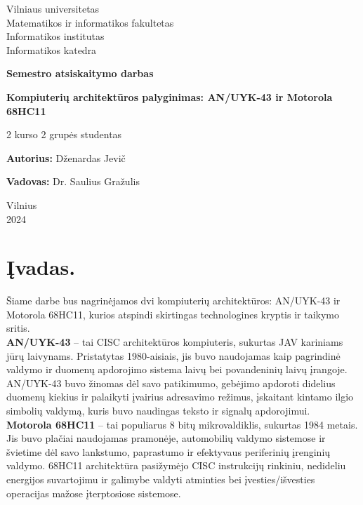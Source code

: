 \documentclass[a4paper,12pt]{article}
\begin{document}
\begin{titlepage}
    \centering
    {\large Vilniaus universitetas \\ Matematikos ir informatikos fakultetas \\ Informatikos institutas \\ Informatikos katedra \par}
    \vspace{2cm}
    {\LARGE \textbf{Semestro atsiskaitymo darbas} \par}
    \vspace{1cm}
    {\LARGE \textbf{Kompiuterių architektūros palyginimas: AN/UYK-43 ir Motorola 68HC11} \par}
    {\large {} \par}
    \vspace{3cm}
    {\large 2 kurso 2 grupės studentas \par}
    \vspace{0.5cm}
    {\large \textbf{Autorius:} Dženardas Jevič \par}
    {\large \textbf{Vadovas:} Dr. Saulius Gražulis \par}
    \vfill
    {\large Vilnius \\ 2024 \par}
\end{titlepage}

\section{Įvadas.}
Šiame darbe bus nagrinėjamos dvi kompiuterių architektūros: AN/UYK-43 ir Motorola 68HC11, kurios atspindi skirtingas technologines kryptis ir taikymo sritis.\\
\textbf{AN/UYK-43} – tai CISC architektūros kompiuteris, sukurtas JAV kariniams jūrų laivynams. Pristatytas 1980-aisiais, jis buvo naudojamas kaip pagrindinė valdymo ir duomenų apdorojimo sistema laivų bei povandeninių laivų įrangoje. AN/UYK-43 buvo žinomas dėl savo patikimumo, gebėjimo apdoroti didelius duomenų kiekius ir palaikyti įvairius adresavimo režimus, įskaitant kintamo ilgio simbolių valdymą, kuris buvo naudingas teksto ir signalų apdorojimui.\\
\textbf{Motorola 68HC11} – tai populiarus 8 bitų mikrovaldiklis, sukurtas 1984 metais. Jis buvo plačiai naudojamas pramonėje, automobilių valdymo sistemose ir švietime dėl savo lankstumo, paprastumo ir efektyvaus periferinių įrenginių valdymo. 68HC11 architektūra pasižymėjo CISC instrukcijų rinkiniu, nedideliu energijos suvartojimu ir galimybe valdyti atminties bei įvesties/išvesties operacijas mažose įterptosiose sistemose.
\end{document}
